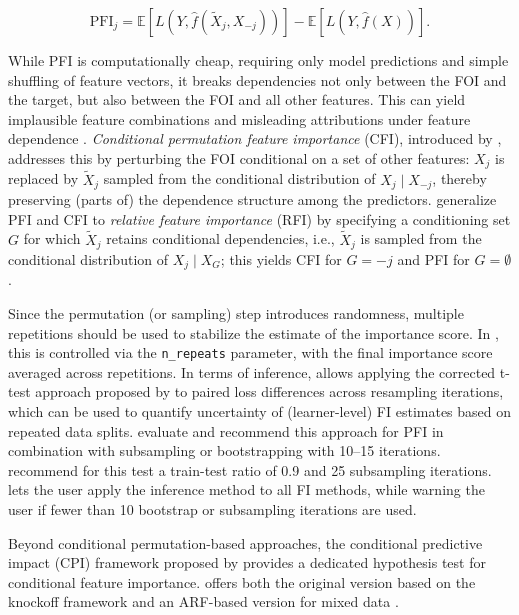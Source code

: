 \begin{equation}
\text{PFI}_j = \mathbb{E}\left[L\left(Y, \hat{f}(\tilde{X}_j, X_{-j})\right)\right] - \mathbb{E}\left[L\left(Y, \hat{f}(X)\right)\right].
\label{eq:pfi}
\end{equation}

While PFI is computationally cheap, requiring only model predictions and simple shuffling of feature vectors, it breaks dependencies not only between the FOI and the target, but also between the FOI and all other features.
This can yield implausible feature combinations and misleading attributions under feature dependence \citep[see][]{hooker2021unrestrictedpermutationb}.
\emph{Conditional permutation feature importance} (CFI), introduced by \citet{strobl2008conditionalvariablec}, addresses this by perturbing the FOI conditional on a set of other features: \(X_j\) is replaced by \(\tilde{X}_j\) sampled from the conditional distribution of \(X_j \mid X_{-j}\), thereby preserving (parts of) the dependence structure among the predictors.
\citet{konig2021relativefeatured} generalize PFI and CFI to \emph{relative feature importance} (RFI) by specifying a conditioning set \(G\) for which \(\tilde{X}_j\) retains conditional dependencies, i.e., \(\tilde{X}_j\) is sampled from the conditional distribution of \(X_j \mid X_G\); this yields CFI for \(G = -j\) and PFI for \(G = \emptyset\).

Since the permutation (or sampling) step introduces randomness, multiple repetitions should be used to stabilize the estimate of the importance score.
In , this is controlled via the \texttt{n\_repeats} parameter, with the final importance score averaged across repetitions.
In terms of inference,  allows applying the corrected t-test approach proposed by \citet{nadeau2003inferencegeneralization} to paired loss differences across resampling iterations, which can be used to quantify uncertainty of (learner-level) FI estimates based on repeated data splits.
\citet{molnar2023relatingpartialc} evaluate and recommend this approach for PFI in combination with subsampling or bootstrapping with 10--15 iterations.
\citet{schulz-kumpel2025constructingconfidence} recommend for this test a train-test ratio of 0.9 and 25 subsampling iterations.
 lets the user apply the inference method to all FI methods, while warning the user if fewer than 10 bootstrap or subsampling iterations are used.

Beyond conditional permutation-based approaches, the conditional predictive impact (CPI) framework proposed by \citet{watson2021testingconditional} provides a dedicated hypothesis test for conditional feature importance.
 offers both the original version based on the knockoff framework \citep{candes2018panninggoldd} and an ARF-based version for mixed data \citep{blesch2025conditionalfeaturea}.

